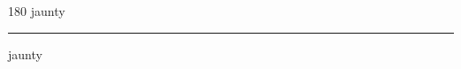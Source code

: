 
\begin{frame}
\begin{center}
\begin{turn}{180}
{\fontsize{2.5cm}{1em}\selectfont jaunty}
\end{turn}
\vspace{1em}\par  
\hrule
\vspace{1em}\par  
{\fontsize{2.5cm}{1em}\selectfont jaunty}
\end{center}
\end{frame}
